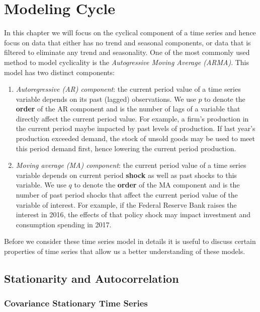 \documentclass[]{book}
\theoremstyle{definition}
\theoremstyle{definition}
\theoremstyle{definition}
\theoremstyle{remark}
\begin{document}
\hypertarget{modeling-cycle}{%
\chapter{Modeling Cycle}\label{modeling-cycle}}

In this chapter we will focus on the cyclical component of a time series and hence focus on data that either has no trend and seasonal components, or data that is filtered to eliminate any trend and seasonality. One of the most commonly used method to model cyclicality is the \emph{Autogressive Moving Average (ARMA)}. This model has two distinct components:

\begin{enumerate}
\def\labelenumi{\arabic{enumi}.}
\item
  \emph{Autoregressive (AR) component}: the current period value of a time series variable depends on its past (lagged) observations. We use \(p\) to denote the \textbf{order} of the AR component and is the number of lags of a variable that directly affect the current period value. For example, a firm's production in the current period maybe impacted by past levels of production. If last year's production exceeded demand, the stock of unsold goods may be used to meet this period demand first, hence lowering the current period production.
\item
  \emph{Moving average (MA) component}: the current period value of a time series variable depends on current period \textbf{shock} as well as past shocks to this variable. We use \(q\) to denote the \textbf{order} of the MA component and is the number of past period shocks that affect the current period value of the variable of interest. For example, if the Federal Reserve Bank raises the interest in 2016, the effects of that policy shock may impact investment and consumption spending in 2017.
\end{enumerate}

Before we consider these time series model in details it is useful to discuss certain properties of time series that allow us a better understanding of these models.

\hypertarget{stationarity-and-autocorrelation}{%
\section{Stationarity and Autocorrelation}\label{stationarity-and-autocorrelation}}

\hypertarget{covariance-stationary-time-series}{%
\subsection{Covariance Stationary Time Series}\label{covariance-stationary-time-series}}
\end{document}
